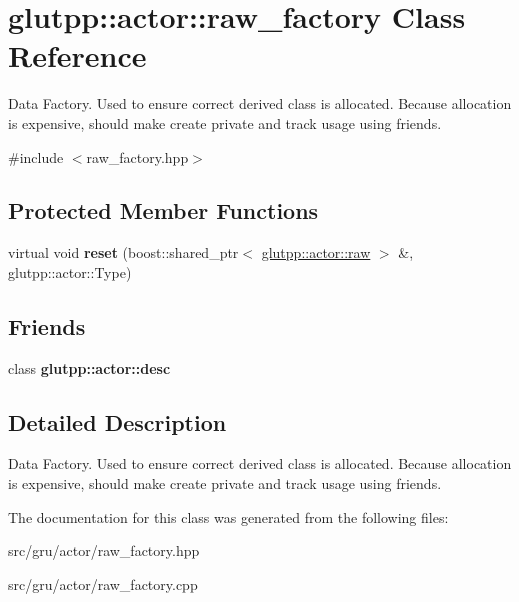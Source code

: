 \hypertarget{classglutpp_1_1actor_1_1raw__factory}{\section{glutpp\-:\-:actor\-:\-:raw\-\_\-factory \-Class \-Reference}
\label{classglutpp_1_1actor_1_1raw__factory}
}


\-Data \-Factory. \-Used to ensure correct derived class is allocated. \-Because allocation is expensive, should make {\ttfamily create} private and track usage using friends.  




{\ttfamily \#include $<$raw\-\_\-factory.\-hpp$>$}

\subsection*{\-Protected \-Member \-Functions}
\begin{DoxyCompactItemize}
\item 
\hypertarget{classglutpp_1_1actor_1_1raw__factory_a60ca837de69b70d43897d6c561f696eb}{virtual void {\bfseries reset} (boost\-::shared\-\_\-ptr$<$ \hyperlink{classglutpp_1_1actor_1_1raw}{glutpp\-::actor\-::raw} $>$ \&, glutpp\-::actor\-::\-Type)}\label{classglutpp_1_1actor_1_1raw__factory_a60ca837de69b70d43897d6c561f696eb}

\end{DoxyCompactItemize}
\subsection*{\-Friends}
\begin{DoxyCompactItemize}
\item 
\hypertarget{classglutpp_1_1actor_1_1raw__factory_ac93ab788bb8af6a1b14c4d6eee75d9ab}{class {\bfseries glutpp\-::actor\-::desc}}\label{classglutpp_1_1actor_1_1raw__factory_ac93ab788bb8af6a1b14c4d6eee75d9ab}

\end{DoxyCompactItemize}


\subsection{\-Detailed \-Description}
\-Data \-Factory. \-Used to ensure correct derived class is allocated. \-Because allocation is expensive, should make {\ttfamily create} private and track usage using friends. 

\-The documentation for this class was generated from the following files\-:\begin{DoxyCompactItemize}
\item 
src/gru/actor/raw\-\_\-factory.\-hpp\item 
src/gru/actor/raw\-\_\-factory.\-cpp\end{DoxyCompactItemize}

